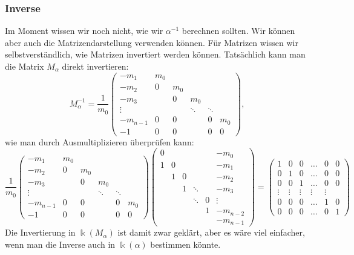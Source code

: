 \subsubsection{Inverse}
Im Moment wissen wir noch nicht, wie wir $\alpha^{-1}$ berechnen sollten.
Wir können aber auch die Matrizendarstellung verwenden können.
Für Matrizen wissen wir selbstverständlich, wie Matrizen invertiert
werden können.
Tatsächlich kann man die Matrix $M_\alpha$ direkt invertieren:
\[
M_\alpha^{-1}
=
\frac{1}{m_0}
\begin{pmatrix}
   -m_1 &m_0&   &      &      &   \\
   -m_2 & 0 &m_0&      &      &   \\
   -m_3 &   & 0 &   m_0&      &   \\
 \vdots &   &   &\ddots&\ddots&   \\
-m_{n-1}& 0 & 0 &      &  0   &m_0\\
    -1  & 0 & 0 &      &  0   & 0
\end{pmatrix},
\]
wie man durch Ausmultiplizieren überprüfen kann:
\[
\frac{1}{m_0}
\begin{pmatrix}
   -m_1 &m_0&   &      &      &   \\
   -m_2 & 0 &m_0&      &      &   \\
   -m_3 &   & 0 &   m_0&      &   \\
 \vdots &   &   &\ddots&\ddots&   \\
-m_{n-1}& 0 & 0 &      &  0   &m_0\\
    -1  & 0 & 0 &      &  0   & 0
\end{pmatrix}
\begin{pmatrix}
0   &    &    &      &   &-m_0    \\
1   & 0  &    &      &   &-m_1    \\
    & 1  & 0  &      &   &-m_2    \\
    &    & 1  &\ddots&   &-m_3    \\
    &    &    &\ddots& 0 &\vdots  \\
    &    &    &      & 1 &-m_{n-2}\\
    &    &    &      &   &-m_{n-1}
\end{pmatrix}
=
\begin{pmatrix}
1&0&0&\dots&0&0\\
0&1&0&\dots&0&0\\
0&0&1&\dots&0&0\\
\vdots&\vdots&\vdots&\vdots&\vdots\\
0&0&0&\dots&1&0\\
0&0&0&\dots&0&1
\end{pmatrix}
\]
Die Invertierung in $\Bbbk(M_\alpha)$ ist damit zwar geklärt, aber
es wäre viel einfacher, wenn man die Inverse auch in $\Bbbk(\alpha)$
bestimmen könnte.

